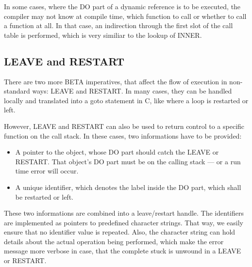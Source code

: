 In some cases, where the DO part of a dynamic reference is to be
executed, the compiler may not know at compile time, which
function to call or whether to call a function at all.  In that
case, an indirection through the first slot of the call table is
performed, which is very similiar to the lookup of INNER.

\subsection{LEAVE and RESTART}
There are two more BETA imperatives, that affect the flow of
execution in non-standard ways: LEAVE and RESTART.  In many
cases, they can be handled locally and translated into a goto
statement in C, like where a loop is restarted or left.

However, LEAVE and RESTART can also be used to return control
to a specific function on the call stack.  In these cases, two
informations have to be provided:
\begin{itemize}
\item A pointer to the object, whose DO part should catch the
    LEAVE or RESTART.  That object's DO part must be on the
    calling stack --- or a run time error will occur.
\item A unique identifier, which denotes the label inside the DO
    part, which shall be restarted or left.
\end{itemize}
These two informations are combined into a leave/restart handle.
The identifiers are implemented as pointers to predefined
character strings.  That way, we easily ensure that no identifier
value is repeated.  Also, the character string can hold details
about the actual operation being performed, which make the error
message more verbose in case, that the complete stuck is unwound
in a LEAVE or RESTART.

